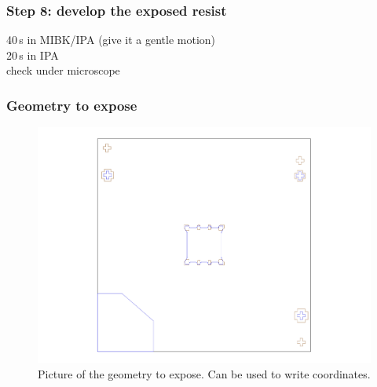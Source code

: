 \subsubsection{Step 8: develop the exposed resist}

40\,s in MIBK/IPA (give it a gentle motion)\\
20\,s in IPA\\

check under microscope\\

\newpage

\subsubsection{Geometry to expose}

\begin{figure} [h] \centering
\includegraphics[scale=0.6]{fig/align1_1.pdf}
\caption{Picture of the geometry to expose. Can be used to write coordinates.} \label{align1}
\end{figure}

\newpage

